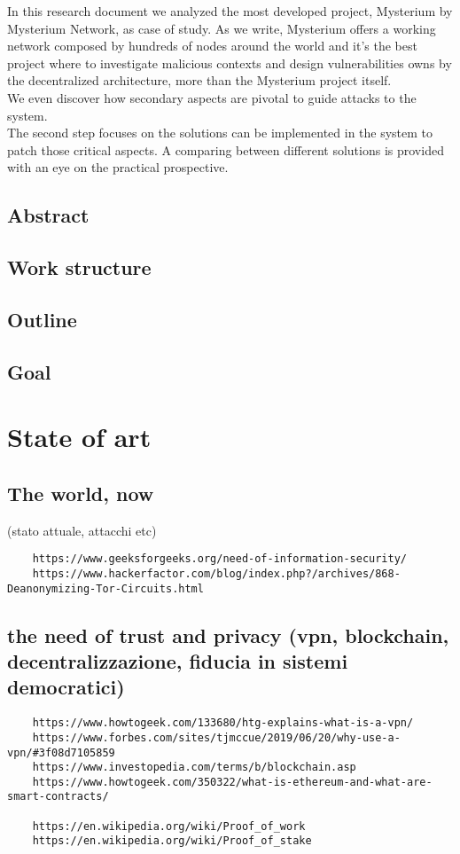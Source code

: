 \documentclass[]{article}
\begin{document}
	In this research document we analyzed the most developed project, Mysterium by Mysterium Network, as case of study. As we write, Mysterium offers a working network composed by hundreds of nodes around the world and it's the best project where to investigate malicious contexts and design vulnerabilities owns by the decentralized architecture, more than the Mysterium project itself.\\We even discover how secondary aspects are pivotal to guide attacks to the system.\\
	The second step focuses on the solutions can be implemented in the system to patch those critical aspects. A comparing between different solutions is provided with an eye on the practical prospective.\\
		
	
	\subsection{Abstract}
	\subsection{Work structure}
	\subsection{Outline}
	\subsection{Goal}
	
	
	\section{State of art}
	
	\subsection{The world, now}
	(stato attuale, attacchi etc)
	
	\begin{verbatim}
	https://www.geeksforgeeks.org/need-of-information-security/
	https://www.hackerfactor.com/blog/index.php?/archives/868-Deanonymizing-Tor-Circuits.html
	\end{verbatim}
	
	\subsection{the need of trust and privacy (vpn, blockchain, decentralizzazione, fiducia in sistemi democratici)}
	\begin{verbatim}
	https://www.howtogeek.com/133680/htg-explains-what-is-a-vpn/
	https://www.forbes.com/sites/tjmccue/2019/06/20/why-use-a-vpn/#3f08d7105859
	https://www.investopedia.com/terms/b/blockchain.asp
	https://www.howtogeek.com/350322/what-is-ethereum-and-what-are-smart-contracts/
	
	https://en.wikipedia.org/wiki/Proof_of_work
	https://en.wikipedia.org/wiki/Proof_of_stake
	\end{verbatim}
	
\end{document}
